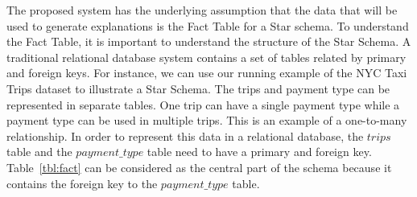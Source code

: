The proposed system has the underlying assumption that the data that will be used to generate explanations is the Fact Table for a Star schema\cite{giovinazzo2000object,adamson2010star}. To understand the Fact Table, it is important to understand the structure of the Star Schema. A traditional relational database system contains a set of tables related by primary and foreign keys. For instance, we can use our running example of the NYC Taxi Trips dataset to illustrate a Star Schema. The trips and payment type can be represented in separate tables. One trip can have a single payment type while a payment type can be used in multiple trips. This is an example of a one-to-many relationship.
In order to represent this data in a relational database, the $trips$ table and the $payment\_type$ table need to have a primary and foreign key. Table~\ref{tbl:fact} can be considered as the central part of the schema because it contains the foreign key to the $payment\_type$ table.





